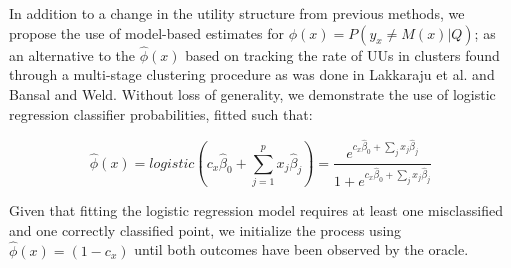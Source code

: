 \documentclass[10pt, conference]{IEEEtran}
\begin{document}
In addition to a change in the utility structure from previous methods, we propose the use of model-based estimates for $\phi(x) = P\left(y_x \neq M(x) |Q \right)$; as an alternative to the  $\hat{\phi}(x)$ based on tracking the rate of UUs in clusters found through a multi-stage clustering procedure as was done in Lakkaraju et al. \cite{Lakkaraju2016} and Bansal and Weld.  Without loss of generality, we demonstrate the use of logistic regression classifier probabilities, fitted such that:

$$\hat{\phi}(x) = logistic(c_x\hat{\beta}_0 + \sum_{j=1}^p x_j\hat{\beta}_j) = \frac{e^{c_x\hat{\beta}_0 + \sum_j x_j\hat{\beta}_j}}{1+e^{c_x\hat{\beta}_0 + \sum_j x_j\hat{\beta}_j}}$$

Given that fitting the logistic regression model requires at least one misclassified and one correctly classified point, we initialize the process using $\hat{\phi}(x) =(1-c_x)$ until both outcomes have been observed by the oracle.

\end{document}

